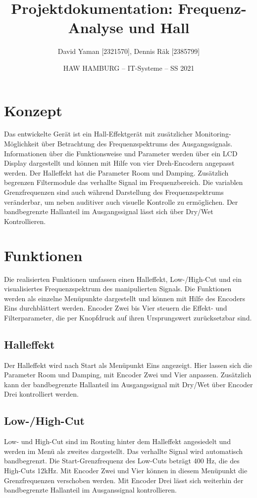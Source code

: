 \documentclass[12pt]{article}
\title{Projektdokumentation: Frequenz-Analyse und Hall}        %
\author{David Yaman [2321570], Dennis Räk [2385799]}            %
\date{HAW HAMBURG -- IT-Systeme -- SS 2021}                    %
\begin{document}
\maketitle
\newpage
\tableofcontents
\newpage
\section{Konzept}
Das entwickelte Gerät ist ein Hall-Effektgerät mit zusätzlicher Monitoring-Möglichkeit über Betrachtung des Frequenzspektrums des Ausgangssignals. 
Informationen über die Funktionsweise und Parameter werden über ein LCD Display dargestellt und können mit Hilfe von vier Dreh-Encodern angepasst werden. 
Der Halleffekt hat die Parameter Room und Damping. Zusätzlich begrenzen Filtermodule das verhallte Signal im Frequenzbereich. 
Die variablen Grenzfrequenzen sind auch während Darstellung des Frequenzspektrums veränderbar, um neben auditiver auch visuelle Kontrolle zu ermöglichen. 
Der bandbegrenzte Hallanteil im Ausgangssignal lässt sich über Dry/Wet Kontrollieren.
\section{Funktionen}
Die realisierten Funktionen umfassen einen Halleffekt, Low-/High-Cut und ein visualisiertes Frequenzspektrum des manipulierten Signals. 
Die Funktionen werden als einzelne Menüpunkte dargestellt und können mit Hilfe des Encoders Eins durchblättert werden. 
Encoder Zwei bis Vier steuern die Effekt- und Filterparameter, die per Knopfdruck auf ihren Ursprungswert zurücksetzbar sind.
\subsection{Halleffekt}
Der Halleffekt wird nach Start als Menüpunkt Eins angezeigt. 
Hier lassen sich die Parameter Room und Damping, mit Encoder Zwei und Vier anpassen. 
Zusätzlich kann der bandbegrenzte Hallanteil im Ausgangssignal mit Dry/Wet über Encoder Drei kontrolliert werden.
\subsection{Low-/High-Cut}
Low- und High-Cut sind im Routing hinter dem Halleffekt angesiedelt und werden im Menü als zweites dargestellt. 
Das verhallte Signal wird automatisch bandbegrenzt. 
Die Start-Grenzfrequenz des Low-Cuts beträgt 400 Hz, die des High-Cuts 12kHz. 
Mit Encoder Zwei und Vier können in diesem Menüpunkt die Grenzfrequenzen verschoben werden. 
Mit Encoder Drei lässt sich weiterhin der bandbegrenzte Hallanteil im Ausganssignal kontrollieren. 
\end{document}
